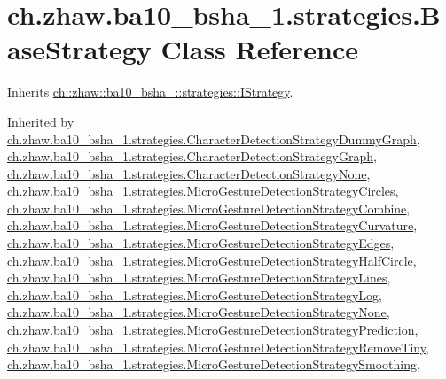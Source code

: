 \hypertarget{classch_1_1zhaw_1_1ba10__bsha__1_1_1strategies_1_1BaseStrategy}{
\section{ch.zhaw.ba10\_\-bsha\_\-1.strategies.BaseStrategy Class Reference}
\label{classch_1_1zhaw_1_1ba10__bsha__1_1_1strategies_1_1BaseStrategy}
}


Inherits \hyperlink{interfacech_1_1zhaw_1_1ba10__bsha__1_1_1strategies_1_1IStrategy}{ch::zhaw::ba10\_\-bsha\_::strategies::IStrategy}.

Inherited by \hyperlink{classch_1_1zhaw_1_1ba10__bsha__1_1_1strategies_1_1CharacterDetectionStrategyDummyGraph}{ch.zhaw.ba10\_\-bsha\_\-1.strategies.CharacterDetectionStrategyDummyGraph}, \hyperlink{classch_1_1zhaw_1_1ba10__bsha__1_1_1strategies_1_1CharacterDetectionStrategyGraph}{ch.zhaw.ba10\_\-bsha\_\-1.strategies.CharacterDetectionStrategyGraph}, \hyperlink{classch_1_1zhaw_1_1ba10__bsha__1_1_1strategies_1_1CharacterDetectionStrategyNone}{ch.zhaw.ba10\_\-bsha\_\-1.strategies.CharacterDetectionStrategyNone}, \hyperlink{classch_1_1zhaw_1_1ba10__bsha__1_1_1strategies_1_1MicroGestureDetectionStrategyCircles}{ch.zhaw.ba10\_\-bsha\_\-1.strategies.MicroGestureDetectionStrategyCircles}, \hyperlink{classch_1_1zhaw_1_1ba10__bsha__1_1_1strategies_1_1MicroGestureDetectionStrategyCombine}{ch.zhaw.ba10\_\-bsha\_\-1.strategies.MicroGestureDetectionStrategyCombine}, \hyperlink{classch_1_1zhaw_1_1ba10__bsha__1_1_1strategies_1_1MicroGestureDetectionStrategyCurvature}{ch.zhaw.ba10\_\-bsha\_\-1.strategies.MicroGestureDetectionStrategyCurvature}, \hyperlink{classch_1_1zhaw_1_1ba10__bsha__1_1_1strategies_1_1MicroGestureDetectionStrategyEdges}{ch.zhaw.ba10\_\-bsha\_\-1.strategies.MicroGestureDetectionStrategyEdges}, \hyperlink{classch_1_1zhaw_1_1ba10__bsha__1_1_1strategies_1_1MicroGestureDetectionStrategyHalfCircle}{ch.zhaw.ba10\_\-bsha\_\-1.strategies.MicroGestureDetectionStrategyHalfCircle}, \hyperlink{classch_1_1zhaw_1_1ba10__bsha__1_1_1strategies_1_1MicroGestureDetectionStrategyLines}{ch.zhaw.ba10\_\-bsha\_\-1.strategies.MicroGestureDetectionStrategyLines}, \hyperlink{classch_1_1zhaw_1_1ba10__bsha__1_1_1strategies_1_1MicroGestureDetectionStrategyLog}{ch.zhaw.ba10\_\-bsha\_\-1.strategies.MicroGestureDetectionStrategyLog}, \hyperlink{classch_1_1zhaw_1_1ba10__bsha__1_1_1strategies_1_1MicroGestureDetectionStrategyNone}{ch.zhaw.ba10\_\-bsha\_\-1.strategies.MicroGestureDetectionStrategyNone}, \hyperlink{classch_1_1zhaw_1_1ba10__bsha__1_1_1strategies_1_1MicroGestureDetectionStrategyPrediction}{ch.zhaw.ba10\_\-bsha\_\-1.strategies.MicroGestureDetectionStrategyPrediction}, \hyperlink{classch_1_1zhaw_1_1ba10__bsha__1_1_1strategies_1_1MicroGestureDetectionStrategyRemoveTiny}{ch.zhaw.ba10\_\-bsha\_\-1.strategies.MicroGestureDetectionStrategyRemoveTiny}, \hyperlink{classch_1_1zhaw_1_1ba10__bsha__1_1_1strategies_1_1MicroGestureDetectionStrategySmoothing}{ch.zhaw.ba10\_\-bsha\_\-1.strategies.MicroGestureDetectionStrategySmoothing}, 
